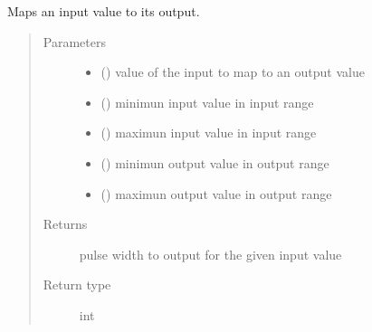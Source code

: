 \documentclass[letterpaper,10pt,english]{sphinxmanual}
\begin{document}
\begin{fulllineitems}
\begin{fulllineitems}
\end{fulllineitems}


\begin{fulllineitems}
\label{\detokenize{generic:AnalogMixerOutput.AnalogMixerOutput.map_values}}
\sphinxAtStartPar
Maps an input value to its output.
\begin{quote}\begin{description}
\item[{Parameters}] \leavevmode\begin{itemize}
\item {} 
\sphinxAtStartPar
{} () \textendash{} value of the input to map to an output value

\item {} 
\sphinxAtStartPar
{} () \textendash{} minimun input value in input range

\item {} 
\sphinxAtStartPar
{} () \textendash{} maximun input value in input range

\item {} 
\sphinxAtStartPar
{} () \textendash{} minimun output value in output range

\item {} 
\sphinxAtStartPar
{} () \textendash{} maximun output value in output range

\end{itemize}

\item[{Returns}] \leavevmode
\sphinxAtStartPar
pulse width to output for the given input value

\item[{Return type}] \leavevmode
\sphinxAtStartPar
int


\end{description}
\end{quote}
\end{fulllineitems}
\end{fulllineitems}
\end{document}

